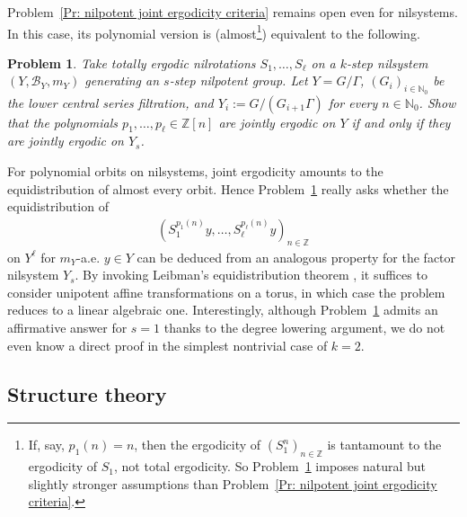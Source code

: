 \documentclass[11pt]{amsart}
\newtheorem{problem}{Problem}
\theoremstyle{definition}
\newcommand{\N}{{\mathbb N}}
\newcommand{\Z}{{\mathbb Z}}
\newcommand{\CB}{{\mathcal B}}
\newcommand{\1}{{\mathbf{1}}}
\begin{document}
Problem~\ref{Pr: nilpotent joint ergodicity criteria} remains open even for nilsystems. In this case, its polynomial version is (almost\footnote{If, say, $p_1(n) = n$, then the ergodicity of $(S_1^n)_{n\in\Z}$ is tantamount to the ergodicity of $S_1$, not {total ergodicity}. So Problem~\ref{Pr: nilpotent joint ergodicity criteria on nilsystems} imposes natural but slightly stronger assumptions than Problem~\ref{Pr: nilpotent joint ergodicity criteria}.}) equivalent to the following.
\begin{problem}\label{Pr: nilpotent joint ergodicity criteria on nilsystems}
    Take  totally ergodic nilrotations $S_1, \ldots, S_\ell$ on a $k$-step nilsystem $(Y, \CB_Y, m_Y)$ generating an $s$-step nilpotent group. Let $Y=G/\Gamma$, $(G_i)_{i\in\N_0}$ be the lower central series filtration, and $Y_i :=G/(G_{i+1}\Gamma)$ for every $n\in\N_0$. Show that the polynomials $p_1,\ldots, p_\ell\in\Z[n]$ are jointly ergodic on $Y$ if and only if they are jointly ergodic on $Y_{s}$.
\end{problem}
For polynomial orbits on nilsystems, joint ergodicity amounts to the equidistribution of almost every orbit. Hence Problem~\ref{Pr: nilpotent joint ergodicity criteria on nilsystems} really asks whether the equidistribution of     
\begin{align*}%
        (S_1^{p_1(n)}y, \ldots, S_\ell^{p_\ell(n)}y)_{n\in\Z}
    \end{align*}
    on $Y^\ell$ for $m_Y$-a.e. $y\in Y$ can be deduced from an analogous property for the factor nilsystem $Y_s$. By invoking Leibman's equidistribution theorem \cite{L05b}, it suffices to consider unipotent affine transformations on a torus, in which case the problem reduces to a linear algebraic one. Interestingly, although Problem~\ref{Pr: nilpotent joint ergodicity criteria on nilsystems} admits an affirmative answer for $s=1$ \cite{FrKu22a} thanks to the degree lowering argument, we do not even know a direct proof in the simplest nontrivial case of $k=2$.

\subsection{Structure theory}
\end{document}
